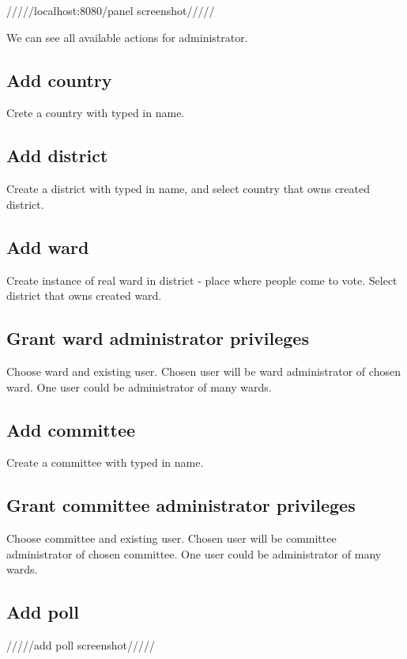 \documentclass[a4paper,twoside,12pt]{book}
\begin{document}
    /////localhost:8080/panel screenshot/////

    We can see all available actions for administrator.
    \subsection{Add country}
      Crete a country with typed in name. 

    \subsection{Add district}
      Create a district with typed in name, and select country that owns created district.

    \subsection{Add ward}
      Create instance of real ward in district - place where people come to vote. 
      Select district that owns created ward.

    \subsection{Grant ward administrator privileges}
      Choose ward and existing user. Chosen user will be ward administrator of chosen ward. One user could be administrator of many wards.

    \subsection{Add committee}
      Create a committee with typed in name.

    \subsection{Grant committee administrator privileges}
      Choose committee and existing user. Chosen user will be committee administrator of chosen committee. One user could be administrator of many wards.

    \subsection{Add poll}

      /////add poll screenshot/////
\end{document}
